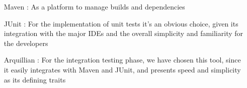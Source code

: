 \begin{itemize}
  \item[Maven]: As a platform to manage builds and dependencies
  \item[JUnit]: For the implementation of unit tests it's an obvious choice,
    given its integration with the major IDEs and the overall simplicity and familiarity for the developers
  \item[Arquillian]: For the integration testing phase, we have chosen this
    tool, since it easily integrates with Maven and JUnit, and presents speed and simplicity as its defining traits
\end{itemize}
